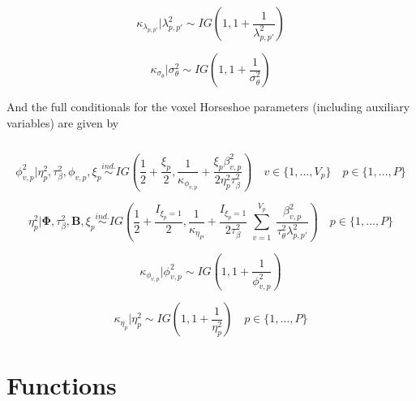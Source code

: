 \documentclass[
]{article}
\begin{document}
\begin{equation}
\kappa_{\lambda_{p,p'}}|\lambda^2_{p,p'} \sim IG \left(1, 1 + \frac{1}{\lambda^2_{p,p'}}\right)
\label{eq:horseshoeKappaLambda}
\end{equation}

\begin{equation}
\kappa_{\sigma_\theta}|\sigma^2_\theta \sim IG \left(1, 1 + \frac{1}{\sigma^2_\theta}\right)
\label{eq:horseshoeKappaSigma}
\end{equation}

And the full conditionals for the voxel Horseshoe parameters (including auxiliary variables) are given by

\begin{equation}
\label{eq:horseshoePhi}
\end{equation}

\begin{equation}
\phi^2_{v,p}| \eta^2_p, \tau^2_\beta, \phi_{v,p}, \xi_p \stackrel{ind.}{\sim} IG \left(\frac{1}{2}+\frac{\xi_p}{2}, \frac{1}{\kappa_{\phi_{v,p}}}+\frac{ \xi_p \beta^2_{v,p}}{2 \eta^2_p \tau^2_\beta}\right) \quad v \in \{1,\ldots,V_p\} \quad p \in \{1,\ldots,P\}
\label{eq:horseshoePhi}
\end{equation}

\begin{equation}
\eta^2_p|  {\boldsymbol \Phi} , \tau^2_\beta,  {\boldsymbol B} , \xi_p \stackrel{ind.}{\sim} IG \left(\frac{1}{2} + \frac{I_{\xi_p=1}}{2}, \frac{1}{\kappa_{\eta_P}} + \frac{I_{\xi_p = 1}}{2 \tau^2_\beta} \sum_{\substack{v=1}}^{V_p}\frac{\beta_{v,p}^2}{\tau^2_{\theta}\lambda^2_{p,p'}} \right) \quad p \in \{1,\ldots,P\}
\label{eq:horseshoeEta}
\end{equation}

\begin{equation}
\kappa_{\phi_{v,p}}|\phi^2_{v,p} \sim IG \left(1, 1 + \frac{1}{\phi^2_{v,p}}\right)
\label{eq:horseshoeKappaPhi}
\end{equation}

\begin{equation}
\kappa_{\eta_p}|\eta^2_p \sim IG \left(1, 1 + \frac{1}{\eta^2_p}\right) \quad p \in \{1,\ldots,P\}
\label{eq:horseshoeKappaEta}
\end{equation}

\section{Functions}\label{functions}
\end{document}
